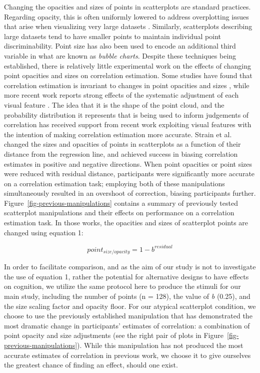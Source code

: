 \documentclass[manuscript,screen,review,anonymous]{acmart}
\begin{document}
Changing the opacities and sizes of points in scatterplots are standard
practices. Regarding opacity, this is often uniformly lowered to address
overplotting issues that arise when visualizing very large datasets
\citep{matejka_2015}. Similarly, scatterplots describing large datasets
tend to have smaller points to maintain individual point
discriminability. Point size has also been used to encode an additional
third variable in what are known as \emph{bubble charts}. Despite these
techniques being established, there is relatively little experimental
work on the effects of changing point opacities and sizes on correlation
estimation. Some studies have found that correlation estimation is
invariant to changes in point opacities and sizes
\citep{rensink_2014, rensink_2017}, while more recent work reports
strong effects of the systematic adjustment of each visual feature
\citep{strain_2023, strain_2023b, strain_2024}. The idea that it is the
shape of the point cloud, and the probability distribution it represents
that is being used to inform judgements of correlation has received
support from recent work exploiting visual features with the intention
of making correlation estimation more accurate. Strain et al.
\citep{strain_2023, strain_2023b, strain_2024} changed the sizes and
opacities of points in scatterplots as a function of their distance from
the regression line, and achieved success in biasing correlation
estimates in positive and negative directions. When point opacities
\citep{strain_2023} or point sizes \citep{strain_2023b} were reduced
with residual distance, participants were significantly more accurate on
a correlation estimation task; employing both of these manipulations
simultaneously \citep{strain_2024} resulted in an overshoot of
correction, biasing participants further.
Figure~\ref{fig-previous-manipulations} contains a summary of previously
tested scatterplot manipulations and their effects on performance on a
correlation estimation task. In those works, the opacities and sizes of
scatterplot points are changed using equation 1:

\begin{equation}
  point_{size/opacity} = 1 - b^{residual}
\end{equation}

In order to facilitate comparison, and as the aim of our study is not to
investigate the use of equation 1, rather the potential for alternative
designs to have effects on cognition, we utilize the same protocol here
to produce the stimuli for our main study, including the number of
points (n = 128), the value of \emph{b} (0.25), and the size scaling
factor and opacity floor. For our atypical scatterplot condition, we
choose to use the previously established manipulation that has
demonstrated the most dramatic change in participants' estimates of
correlation: a combination of point opacity and size adjustments
\citep{strain_2024} (see the right pair of plots in
Figure~\ref{fig-previous-manipulations}). While this manipulation has
not produced the most accurate estimates of correlation in previous
work, we choose it to give ourselves the greatest chance of finding an
effect, should one exist.
\end{document}
